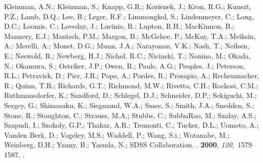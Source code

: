 \begin{thebibliography}{-------}
  {Kleinman}, A.N.; {Kleinman}, S.; {Knapp}, G.R.; {Korienek}, J.; {Kron},
  R.G.; {Kunszt}, P.Z.; {Lamb}, D.Q.; {Lee}, B.; {Leger}, R.F.; {Limmongkol},
  S.; {Lindenmeyer}, C.; {Long}, D.C.; {Loomis}, C.; {Loveday}, J.; {Lucinio},
  R.; {Lupton}, R.H.; {MacKinnon}, B.; {Mannery}, E.J.; {Mantsch}, P.M.;
  {Margon}, B.; {McGehee}, P.; {McKay}, T.A.; {Meiksin}, A.; {Merelli}, A.;
  {Monet}, D.G.; {Munn}, J.A.; {Narayanan}, V.K.; {Nash}, T.; {Neilsen}, E.;
  {Neswold}, R.; {Newberg}, H.J.; {Nichol}, R.C.; {Nicinski}, T.; {Nonino}, M.;
  {Okada}, N.; {Okamura}, S.; {Ostriker}, J.P.; {Owen}, R.; {Pauls}, A.G.;
  {Peoples}, J.; {Peterson}, R.L.; {Petravick}, D.; {Pier}, J.R.; {Pope}, A.;
  {Pordes}, R.; {Prosapio}, A.; {Rechenmacher}, R.; {Quinn}, T.R.; {Richards},
  G.T.; {Richmond}, M.W.; {Rivetta}, C.H.; {Rockosi}, C.M.; {Ruthmansdorfer},
  K.; {Sandford}, D.; {Schlegel}, D.J.; {Schneider}, D.P.; {Sekiguchi}, M.;
  {Sergey}, G.; {Shimasaku}, K.; {Siegmund}, W.A.; {Smee}, S.; {Smith}, J.A.;
  {Snedden}, S.; {Stone}, R.; {Stoughton}, C.; {Strauss}, M.A.; {Stubbs}, C.;
  {SubbaRao}, M.; {Szalay}, A.S.; {Szapudi}, I.; {Szokoly}, G.P.; {Thakar},
  A.R.; {Tremonti}, C.; {Tucker}, D.L.; {Uomoto}, A.; {Vanden Berk}, D.;
  {Vogeley}, M.S.; {Waddell}, P.; {Wang}, S.i.; {Watanabe}, M.; {Weinberg},
  D.H.; {Yanny}, B.; {Yasuda}, N.; {SDSS Collaboration}.
.
 {\bf 2000}, {\em 120},~1579--1587,
  \href{http://xxx.lanl.gov/abs/astro-ph/0006396}{{\normalfont
  [astro-ph/0006396]}}.


\end{thebibliography}
